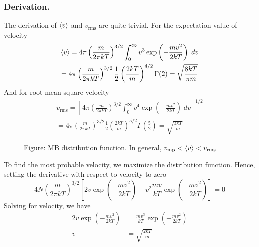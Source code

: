\documentclass[../../../Main.tex]{subfiles}
\begin{document}
\subsubsection{Derivation.} The derivation of $\braket{v}$ and $v_\text{rms}$ are quite trivial. For the expectation value of velocity
\begin{multline*}
    \braket{v}=4\pi \left(\frac{m}{2\pi k T}\right)^{3/2} \int_{0}^{\infty}v^3\exp\left(-\frac{m v^2}{2k T}\right)\;dv\\
    =4\pi \left(\frac{m}{2\pi k T}\right)^{3/2} \frac{1}{2}\left(\frac{2kT}{m}\right)^{4/2}\Gamma(2)=\sqrt{\frac{8kT}{\pi m}}
\end{multline*} 
And for root-mean-square-velocity
\begin{multline*}
    v_\text{rms}=\left[4\pi \left(\frac{m}{2\pi k T}\right)^{3/2} \int_{0}^{\infty}v^4\exp\left(-\frac{m v^2}{2k T}\right)\;dv\right]^{1/2}\\
    =4\pi \left(\frac{m}{2\pi k T}\right)^{3/2} \frac{1}{2}\left(\frac{2kT}{m}\right)^{5/2}\Gamma\left(\frac{5}{2}\right)=\sqrt{\frac{3kT}{m}}
\end{multline*} 
\begin{figure}
    \centering
    \caption*{Figure: MB distribution function. In general, $v_\text{mp}<\braket{v}<v_\text{rms}$}
\end{figure}

To find the most probable velocity, we maximize the distribution function. Hence, setting the derivative with respect to velocity to zero
\begin{equation*}
    4N\left(\frac{m}{2\pi kT}\right)^{3/2}\left[2v\exp\left(-\frac{m v^2}{2k T}\right)-v^2\frac{mv}{kT}\exp\left(-\frac{m v^2}{2k T}\right)\right]=0
\end{equation*}
Solving for velocity, we have 
\begin{align*}
    2v\exp\left(-\frac{m v^2}{2k T}\right)&=\frac{mv^3}{kT}\exp\left(-\frac{m v^2}{2k T}\right)\\
    v&=\sqrt{\frac{2kT}{m}}
\end{align*}
\end{document}
